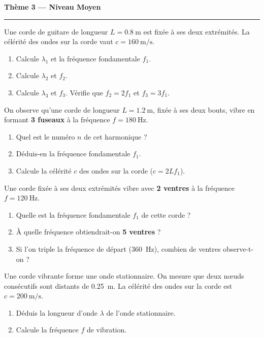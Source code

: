 \documentclass[11pt,a4paper]{article}
\begin{document}
\begin{center}
{\large\bfseries\color{primarydark} Thème 3 — Niveau Moyen}\\[-2pt]
{\color{primary}\rule{5cm}{1pt}}
\end{center}

\begin{exo}
Une corde de guitare de longueur $L=\SI{0.8}{\metre}$ est fixée à ses deux extrémités. La
célérité des ondes sur la corde vaut $c=\SI{160}{\metre\per\second}$.
\begin{enumerate}[label=\alph*)]
  \item Calcule $\lambda_1$ et la fréquence fondamentale $f_1$.
  \item Calcule $\lambda_2$ et $f_2$.
  \item Calcule $\lambda_3$ et $f_3$. Vérifie que $f_2=2f_1$ et $f_3=3f_1$.
\end{enumerate}
\end{exo}

\begin{exo}
On observe qu'une corde de longueur $L=\SI{1.2}{\metre}$, fixée à ses deux bouts, vibre en
formant \textbf{3 fuseaux} à la fréquence $f=\SI{180}{\hertz}$.
\begin{enumerate}[label=\alph*)]
  \item Quel est le numéro $n$ de cet harmonique ?
  \item Déduis-en la fréquence fondamentale $f_1$.
  \item Calcule la célérité $c$ des ondes sur la corde ($c=2L f_1$).
\end{enumerate}
\end{exo}

\begin{exo}
Une corde fixée à ses deux extrémités vibre avec \textbf{2 ventres} à la fréquence
$f=\SI{120}{\hertz}$.
\begin{enumerate}[label=\alph*)]
  \item Quelle est la fréquence fondamentale $f_1$ de cette corde ?
  \item À quelle fréquence obtiendrait-on \textbf{5 ventres} ?
  \item Si l'on triple la fréquence de départ (\SI{360}{\hertz}), combien de ventres observe-t-on ?
\end{enumerate}
\end{exo}

\begin{exo}
Une corde vibrante forme une onde stationnaire. On mesure que deux nœuds consécutifs sont
distants de \SI{0.25}{\metre}. La célérité des ondes sur la corde est $c=\SI{200}{\metre\per\second}$.
\begin{enumerate}[label=\alph*)]
  \item Déduis la longueur d'onde $\lambda$ de l'onde stationnaire.
  \item Calcule la fréquence $f$ de vibration.
\end{enumerate}
\end{exo}
\end{document}
